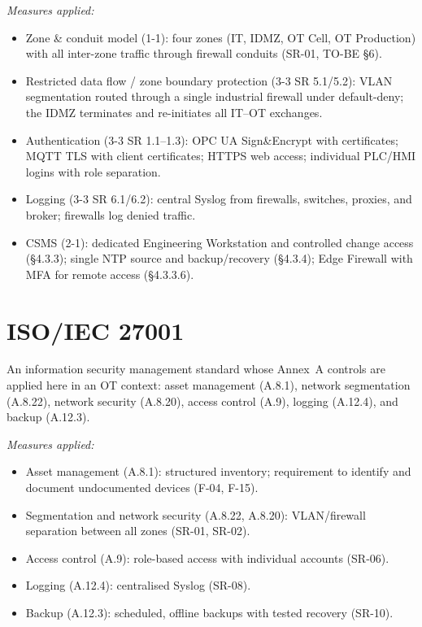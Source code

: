 \documentclass{report}
\begin{document}
\textit{Measures applied:}
\begin{itemize}[nosep]
  \item Zone \& conduit model (1-1): four zones (IT, IDMZ, OT Cell, OT Production) with all inter-zone traffic through firewall conduits (SR-01, TO-BE \S6).

    \item Restricted data flow / zone boundary protection (3-3 SR 5.1/5.2): VLAN segmentation routed through a single industrial firewall under default-deny; the IDMZ terminates and re-initiates all IT--OT exchanges.

    \item Authentication (3-3 SR 1.1--1.3): OPC UA Sign\&Encrypt with certificates; MQTT TLS with client certificates; HTTPS web access; individual PLC/HMI logins with role separation.

    \item Logging (3-3 SR 6.1/6.2): central Syslog from firewalls, switches, proxies, and broker; firewalls log denied traffic.

    \item CSMS (2-1): dedicated Engineering Workstation and controlled change access (\S4.3.3); single NTP source and backup/recovery (\S4.3.4); Edge Firewall with MFA for remote access (\S4.3.3.6).
\end{itemize}

\section{ISO/IEC 27001}
An information security management standard whose Annex~A controls are applied here in an OT context: asset management (A.8.1), network segmentation (A.8.22), network security (A.8.20), access control (A.9), logging (A.12.4), and backup (A.12.3).

\textit{Measures applied:}
\begin{itemize}[nosep]
  \item Asset management (A.8.1): structured inventory; requirement to identify and document undocumented devices (F-04, F-15).
  \item Segmentation and network security (A.8.22, A.8.20): VLAN/firewall separation between all zones (SR-01, SR-02).
  \item Access control (A.9): role-based access with individual accounts (SR-06).
  \item Logging (A.12.4): centralised Syslog (SR-08).
  \item Backup (A.12.3): scheduled, offline backups with tested recovery (SR-10).
\end{itemize}
\end{document}
